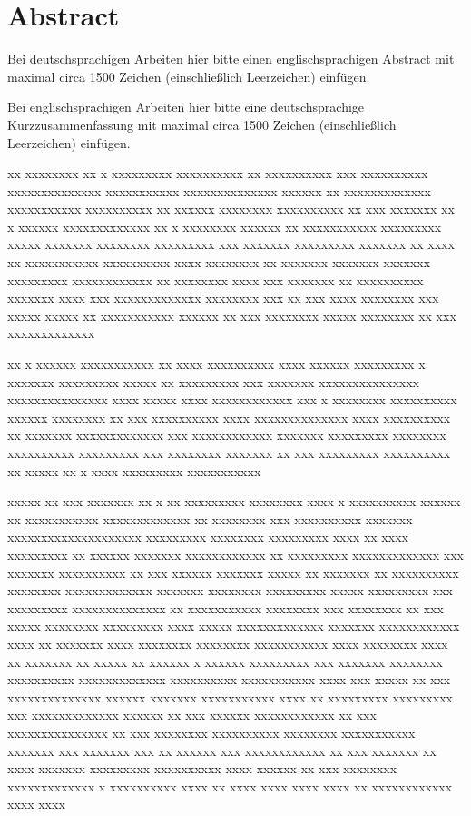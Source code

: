 %
\chapter*{Abstract}
\markboth{\abstractname}{\abstractname}
\thispagestyle{empty}
Bei deutschsprachigen Arbeiten hier bitte einen englischsprachigen Abstract mit maximal circa 1500 Zeichen (einschließlich Leerzeichen) einfügen.

Bei englischsprachigen Arbeiten hier bitte eine deutschsprachige Kurzzusammenfassung mit maximal circa 1500 Zeichen (einschließlich Leerzeichen) einfügen.

\begin{otherlanguage}{english}%
xx xxxxxxxx xx x xxxxxxxxx xxxxxxxxxx xx xxxxxxxxxx xxx xxxxxxxxxx xxxxxxxxxxxxxx xxxxxxxxxxx xxxxxxxxxxxxxx xxxxxx xx xxxxxxxxxxxxx xxxxxxxxxxx xxxxxxxxxx xx xxxxxx xxxxxxxx xxxxxxxxxx xx xxx xxxxxxx xx x xxxxxx xxxxxxxxxxxxx xx x xxxxxxxx xxxxxx xx xxxxxxxxxxx xxxxxxxxx xxxxx xxxxxxx xxxxxxxx xxxxxxxxx xxx xxxxxxx xxxxxxxxx xxxxxxx xx xxxx xx xxxxxxxxxxx xxxxxxxxxx xxxx xxxxxxxx xx xxxxxxx xxxxxxx xxxxxxx xxxxxxxxx xxxxxxxxxxxx xx xxxxxxxx xxxx xxx xxxxxxx xx xxxxxxxxxx xxxxxxx xxxx xxx xxxxxxxxxxxxx xxxxxxxx xxx xx xxx xxxx xxxxxxxx xxx xxxxx xxxxx xx xxxxxxxxxxx xxxxxx xx xxx xxxxxxxx xxxxx xxxxxxxx xx xxx xxxxxxxxxxxxx

xx x xxxxxx xxxxxxxxxxx xx xxxx xxxxxxxxxx xxxx xxxxxx xxxxxxxxx x xxxxxxx xxxxxxxxx xxxxx xx xxxxxxxxx xxx xxxxxxx xxxxxxxxxxxxxxx xxxxxxxxxxxxxxx xxxx xxxxx xxxx xxxxxxxxxxxx xxx x xxxxxxxx xxxxxxxxxx xxxxxx xxxxxxxx xx xxx xxxxxxxxxx xxxx xxxxxxxxxxxxxx xxxx xxxxxxxxxx xx xxxxxxx xxxxxxxxxxxxx xxx xxxxxxxxxxxx xxxxxxx xxxxxxxxx xxxxxxxx xxxxxxxxxx xxxxxxxxx xxx xxxxxxxx xxxxxxx xx xxx xxxxxxxxx xxxxxxxxxx xx xxxxx xx x xxxx xxxxxxxxx xxxxxxxxxxx

xxxxx xx xxx xxxxxxx xx x xx xxxxxxxxx xxxxxxxx xxxx x xxxxxxxxxx xxxxxx xx xxxxxxxxxxx xxxxxxxxxxxxx xx xxxxxxxx xxx xxxxxxxxxx xxxxxxx xxxxxxxxxxxxxxxxxxxx xxxxxxxxx xxxxxxxx xxxxxxxxx xxxx xx xxxx xxxxxxxxx xx xxxxxx xxxxxxx xxxxxxxxxxxx xx xxxxxxxxx xxxxxxxxxxxxx xxx xxxxxxx xxxxxxxxxx xx xxx xxxxxx xxxxxxx xxxxx xx xxxxxxx xx xxxxxxxxxx xxxxxxxx xxxxxxxxxxxxx xxxxxxx xxxxxxxx xxxxxxxxx xxxxx xxxxxxxxx xxx xxxxxxxxx xxxxxxxxxxxxxx xx xxxxxxxxxxx xxxxxxxx xxx xxxxxxxx xx xxx xxxxx xxxxxxxx xxxxxxxxx xxxx xxxxx xxxxxxxxxxxxx xxxxxxx xxxxxxxxxxxx xxxx xx xxxxxxx xxxx xxxxxxxx xxxxxxxx xxxxxxxxxxx xxxx xxxxxxxx xxxx xx xxxxxxx xx xxxxx xx xxxxxx x xxxxxx xxxxxxxxx xxx xxxxxxx xxxxxxxx xxxxxxxxxx xxxxxxxxxxxxx xxxxxxxxxx xxxxxxxxxxx xxxx xxx xxxxx xx xxx xxxxxxxxxxxxxx xxxxxx xxxxxxx xxxxxxxxxxx xxxx xx xxxxxxxxx xxxxxxxxx xxx xxxxxxxxxxxxx xxxxxx xx xxx xxxxxx xxxxxxxxxxxx xx xxx xxxxxxxxxxxxxxx xx xxx xxxxxxxx xxxxxxxxxx xxxxxxxx xxxxxxxxxxx xxxxxxx xxx xxxxxxx xxx xx xxxxxx xxx xxxxxxxxxxxx xx xxx xxxxxxx xx xxxx xxxxxxx xxxxxxxxx xxxxxxxxxx xxxx xxxxxx xx xxx xxxxxxxx xxxxxxxxxxxxx x xxxxxxxxxx xxxx xx xxxx xxxx xxxx xxxx xx xxxxxxxxxxxx xxxx xxxx
\end{otherlanguage}